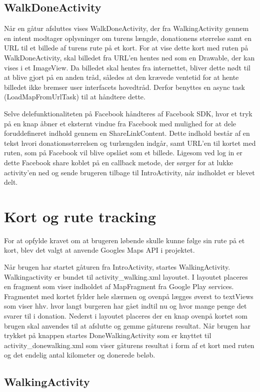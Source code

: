\subsection{WalkDoneActivity}
Når en gåtur afsluttes vises WalkDoneActivity, der fra WalkingActivity gennem en intent modtager oplysninger om turens længde, donationens størrelse samt en URL til et billede af turens rute på et kort. For at vise dette kort med ruten på WalkDoneActivity, skal billedet fra URL’en hentes ned som en Drawable, der kan vises i et ImageView. Da billedet skal hentes fra internettet, bliver dette nødt til at blive gjort på en anden tråd, således at den krævede ventetid for at hente billedet ikke bremser user interfacets hovedtråd. Derfor benyttes en async task (LoadMapFromUrlTask) til at håndtere dette.

Selve delefunktionaliteten på Facebook håndteres af Facebook SDK, hvor et tryk på en knap åbner et eksternt vindue fra Facebook med mulighed for at dele foruddefineret indhold gennem en ShareLinkContent. Dette indhold består af en tekst hvori donationsstørrelsen og turlængden indgår, samt URL’en til kortet med ruten, som på Facebook vil blive opslået som et billede. Ligesom ved log in er dette Facebook share koblet på en callback metode, der sørger for at lukke activity’en ned og sende brugeren tilbage til IntroActivity, når indholdet er blevet delt.

\section{Kort og rute tracking}
For at opfylde kravet om at brugeren løbende skulle kunne følge sin rute på et kort, blev det valgt at anvende Googles Maps API i projektet.

Når brugen har startet gåturen fra IntroActivity, startes WalkingActivity. Walkingactivity er bundet til activity\_walking.xml layoutet. I layoutet placeres en fragment som viser indholdet af MapFragment fra Google Play services. Fragmentet med kortet fylder hele slærmen og ovenpå lægges øverst to textViews som viser hhv. hvor langt burgeren har gået indtil nu og hvor mange penge det svarer til i donation.
Nederst i layoutet placeres der en knap ovenpå kortet som brugen skal anvendes til at afslutte og gemme gåturens resultat. Når brugen har trykket på knappen startes DoneWalkingActivity som er knyttet til activity\_donewalking.xml som viser gåturens resultat i form af et kort med ruten og det endelig antal kilometer og donerede beløb.

\subsection{WalkingActivity}

